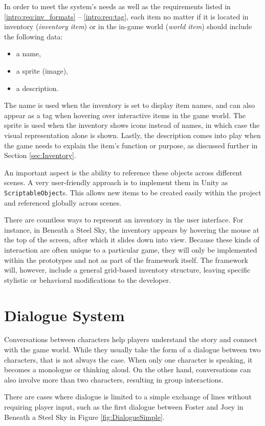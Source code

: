 In order to meet the system's needs as well as the requirements listed in \ref{intro:req:inv_formats} – \ref{intro:req:tag}, each item no matter if it is located in inventory (\textit{inventory item}) or in the in-game world (\textit{world item}) should include the following data:
\begin{itemize}
\item a name,
\item a sprite (image),
\item a description.
\end{itemize}

The name is used when the inventory is set to display item names, and can also appear as a tag when hovering over interactive items in the game world. The sprite is used when the inventory shows icons instead of names, in which case the visual representation alone is shown. Lastly, the description comes into play when the game needs to explain the item's function or purpose, as discussed further in Section \ref{sec:Inventory}.

An important aspect is the ability to reference these objects across different scenes. A very user-friendly approach is to implement them in Unity as \verb|ScriptableObject|s. This allows new items to be created easily within the project and referenced globally across scenes.

There are countless ways to represent an inventory in the user interface. For instance, in Beneath a Steel Sky, the inventory appears by hovering the mouse at the top of the screen, after which it slides down into view. Because these kinds of interaction are often unique to a particular game, they will only be implemented within the prototypes and not as part of the framework itself. The framework will, however, include a general grid-based inventory structure, leaving specific stylistic or behavioral modifications to the developer.

\section{Dialogue System}
Conversations between characters help players understand the story and connect with the game world. While they usually take the form of a dialogue between two characters, that is not always the case. When only one character is speaking, it becomes a monologue or thinking aloud. On the other hand, conversations can also involve more than two characters, resulting in group interactions. 

There are cases where dialogue is limited to a simple exchange of lines without requiring player input, such as the first dialogue between Foster and Joey in Beneath a Steel Sky in Figure \ref{fig:DialogueSimple}. 

